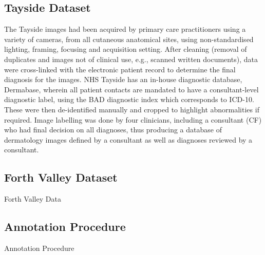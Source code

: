 \subsection{Tayside Dataset}
\label{subsec:tayside_dataset}
The Tayside images had been acquired by primary care practitioners using a variety of cameras, from all cutaneous anatomical sites, using non-standardised lighting, framing, focusing and acquisition setting. After cleaning (removal of duplicates and images not of clinical use, e.g., scanned written documents), data were cross-linked with the electronic patient record to determine the final diagnosis for the images. NHS Tayside has an in-house diagnostic database, Dermabase, wherein all patient contacts are mandated to have a consultant-level diagnostic label, using the BAD diagnostic index which corresponds to ICD-10. These were then de-identified manually and cropped to highlight abnormalities if required. Image labelling was done by four clinicians, including a consultant (CF) who had final decision on all diagnoses, thus producing a database of dermatology images defined by a consultant as well as diagnoses reviewed by a consultant.

\subsection{Forth Valley Dataset}
\label{subsec:forth_valley_dataset}
Forth Valley Data

\subsection{Annotation Procedure}
\label{subsec:annotation_procedure}
Annotation Procedure

